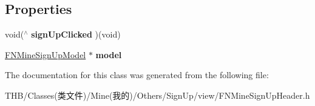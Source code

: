 \subsection*{Properties}
\begin{DoxyCompactItemize}
\item 
\mbox{\label{interface_f_n_mine_sign_up_header_a0adbe85c12d1634a2034805bc35c8b33}} 
void($^\wedge$ {\bfseries sign\+Up\+Clicked} )(void)
\item 
\mbox{\label{interface_f_n_mine_sign_up_header_a64a58ec6943bef2f8f60f8f9569fd86d}} 
\mbox{\hyperlink{interface_f_n_mine_sign_up_model}{F\+N\+Mine\+Sign\+Up\+Model}} $\ast$ {\bfseries model}
\end{DoxyCompactItemize}


The documentation for this class was generated from the following file\+:\begin{DoxyCompactItemize}
\item 
T\+H\+B/\+Classes(类文件)/\+Mine(我的)/\+Others/\+Sign\+Up/view/F\+N\+Mine\+Sign\+Up\+Header.\+h\end{DoxyCompactItemize}
